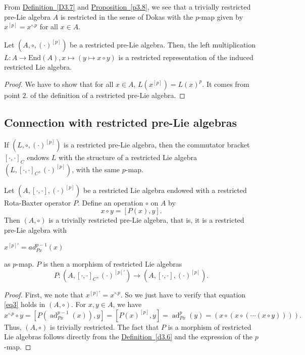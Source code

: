 \documentclass[11pt, twoside]{article}
\DeclareMathOperator{\ad}{ad}
\begin{document}
From \hyperref[D3.7]{Definition~\ref*{D3.7}} and \hyperref[p3.8]{Proposition~\ref*{p3.8}}, we see that a trivially restricted pre-Lie algebra $A$ is restricted in the sense of Dokas with the $p$-map given by $x^{[p]}=x^{\circ.p} $ for all $x\in A$.

\begin{prop}
    Let $(A,\circ, (\cdot)^{[p]}) $ be a restricted pre-Lie algebra. Then, the left multiplication $L:A\to \mathrm{End}(A), x\mapsto (y\mapsto x\circ y) $ is a restricted representation of the induced restricted Lie algebra.
\end{prop}

\begin{proof}
    We have to show that for all $x\in A $, $L(x^{[p]})=L(x)^p $. It comes from point $2.$ of the definition of a restricted pre-Lie algebra.
\end{proof}

\subsection{Connection with restricted pre-Lie algebras}
 

If $(L,\circ,(\cdot)^{[p]}) $ is a restricted pre-Lie algebra, then the commutator bracket $[\cdot,\cdot]_C $ endows $L$ with the structure of a restricted Lie algebra $(L,[\cdot,\cdot]_C,(\cdot)^{[p]}) $, with the same $p$-map. 

\begin{prop}\label{p3.13}
Let $( A,[\cdot ,\cdot ], (\cdot)^{[p]}) $ be a restricted Lie algebra endowed with a restricted Rota-Baxter operator $P$. Define an operation $\circ$ on $A$ by
\begin{equation}
x\circ y=[P(x), y].
\end{equation}
Then $( A, \circ) $ is a trivially restricted pre-Lie algebra, that is, it is a restricted pre-Lie algebra with \begin{center}
    $x^{[p]'}= ad_{Px}^{p-1}(x)  $
\end{center} as $p$-map. $P$ is then a morphism of restricted Lie algebras $$P: ( A,[\cdot ,\cdot ]_C, (\cdot)^{[p]'}) \to (A,[\cdot,\cdot],(\cdot)^{[p]}).  $$
\end{prop}

\begin{proof}
    First, we note that $x^{[p]'}= x^{\circ.p} $. So we just have to verify that equation \eqref{eq3} holds in $(A,\circ)$. For $x,y\in A$, we have \begin{equation}\label{eq4}
        x^{\circ. p}\circ y = [P(\ad_{Px}^{p-1}(x)),y]= [P(x)^{[p]},y]= \ad_{Px}^p(y)=(x\circ (x\circ (\cdots (x\circ y)))). \end{equation}  Thus, $(A,\circ) $ is trivially restricted. The fact that $P$ is a morphism of restricted Lie algebras follows directly from the \hyperref[d3.6]{Definition~\ref*{d3.6}} and the expression of the $p$-map. 
\end{proof}
\end{document}
